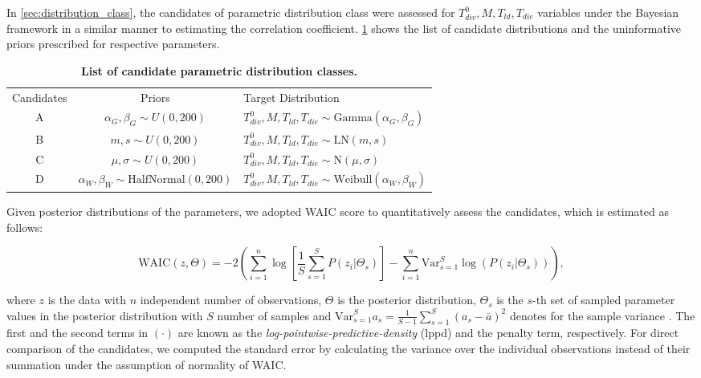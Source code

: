 \documentclass[11pt, a4paper]{article}
\begin{document}
In \cref{sec:distribution_class}, the candidates of parametric distribution class were assessed for $T_{div}^0, M, T_{ld}, T_{die}$ variables under the Bayesian framework in a similar manner to estimating the correlation coefficient. \cref{tab:candidate_distribution} shows the list of candidate distributions and the uninformative priors prescribed for respective parameters. 
\begin{table}[h]
    \centering
    \begin{tabular}{@{}ccl@{}}
        \toprule
        Candidates & Priors & Target Distribution \\ \cmidrule(l){1-1} \cmidrule(l){2-2} \cmidrule(l){3-3}
        A & $\alpha_G, \beta_G \sim U(0,200)$ & $T_{div}^0, M, T_{ld}, T_{die} \sim \mathrm{Gamma}(\alpha_G, \beta_G)$ \\
        B & $m, s \sim U(0,200)$ & $T_{div}^0, M, T_{ld}, T_{die} \sim \mathrm{LN}(m, s)$ \\
        C & $\mu, \sigma \sim U(0,200)$ & $T_{div}^0, M, T_{ld}, T_{die} \sim \mathrm{N}(\mu, \sigma)$ \\
        D & $\alpha_W, \beta_W \sim \mathrm{HalfNormal}(0, 200)$ & $T_{div}^0, M, T_{ld}, T_{die} \sim \mathrm{Weibull}(\alpha_W, \beta_W)$ \\
        \bottomrule    
    \end{tabular}
    \caption{\textbf{List of candidate parametric distribution classes.}}
    \label{tab:candidate_distribution}
\end{table}
Given posterior distributions of the parameters, we adopted WAIC \parencite{Watanabe.2010} score to quantitatively assess the candidates, which is estimated as follows:
\begin{linenomath*}
    \begin{equation*}
        \mathrm{WAIC}(z, \Theta) = -2 \left(\sum_{i=1}^n \log\left[\frac{1}{S} \sum_{s=1}^S P(z_i|\Theta_s)\right] - \sum_{i=1}^n \mathrm{Var}_{s=1}^S \log(P(z_i|\Theta_s)) \right),
    \end{equation*}
\end{linenomath*}
where $z$ is the data with $n$ independent number of observations, $\Theta$ is the posterior distribution,  $\Theta_s$ is the $s$-th set of sampled parameter values in the posterior distribution with $S$ number of samples and $\mathrm{Var}_{s=1}^S a_s = \frac{1}{S-1} \sum_{s=1}^S (a_s - \bar{a})^2$ denotes for the sample variance  \parencite{McElreath.2020, Vehtari.2017}. The first and the second terms in $(\cdot)$ are known as the \textit{log-pointwise-predictive-density} (lppd) and the penalty term, respectively. For direct comparison of the candidates, we computed the standard error by calculating the variance over the individual observations instead of their summation under the assumption of normality of WAIC.
\end{document}
